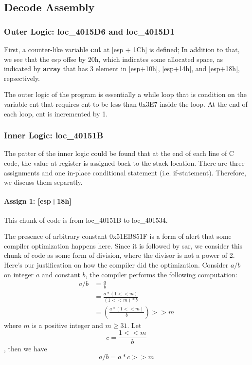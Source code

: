 \documentclass[11pt]{article}
\begin{document}
\subsection{Decode Assembly}
\subsubsection{Outer Logic: loc\_4015D6 and loc\_4015D1}
First, a counter-like variable \textbf{cnt} at [esp + 1Ch] is defined; In addition to that, we see that the esp offse by 20h, which indicates some allocated space, as indicated by \textbf{array} that has 3 element in [esp+10h], [esp+14h], and [esp+18h], repsectively. 

The outer logic of the program is essentially a while loop that is condition on the variable cnt that requires cnt to be less than 0x3E7 inside the loop. At the end of each loop, cnt is incremented by 1. 

\subsubsection{Inner Logic: loc\_40151B}

The patter of the inner logic could be found that at the end of each line of C code, the value at register is assigned back to the stack location. There are three assignments and one in-place conditional statement (i.e. if-statement). Therefore, we discuss them separatly.

\paragraph{Assign 1: [esp+18h]}

This chunk of code is from loc\_40151B to loc\_401534.

The presence of arbitrary constant 0x51EB851F is a form of alert that some compiler optimization happens here. Since it is followed by sar, we consider this chunk of code as some form of division, where the divisor is not a power of 2. Here's our justification on how the compiler did the optimization. Consider $a/b$ on integer $a$ and constant $b$, the compiler performs the following computation:
\begin{align*}
    a / b &= \frac{a}{b} \\
    &= \frac{a * (1 << m)}{(1 << m) * b} \\
    &=(\frac{a * (1 << m)}{b}) >> m
\end{align*}
where $m$ is a positive integer and $m \geq 31$. Let $$c = \frac{1 << m}{b}$$, then we have 
$$a / b = a * c >> m$$
\end{document}
